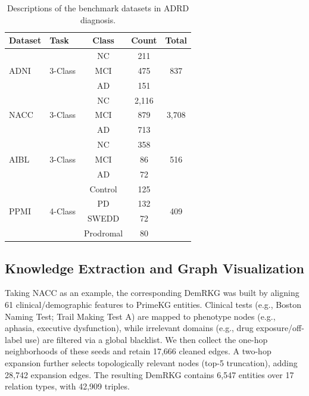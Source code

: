 \documentclass[lettersize,journal]{IEEEtran}
\begin{document}
    \begin{table}[htbp]
        \centering
        \caption{Descriptions of the benchmark datasets in ADRD diagnosis.}
        \label{tab:dataset_statistics}
        \begin{tabular}{llccc}
            \toprule
            \textbf{Dataset} & \textbf{Task} & \textbf{Class} & \textbf{Count} & \textbf{Total} \\
            \midrule
            \multirow{3}{*}{ADNI} & \multirow{3}{*}{3-Class} & NC & 211 & \multirow{3}{*}{837} \\
            & & MCI & 475 & \\
            & & AD & 151 & \\
            \midrule
            \multirow{3}{*}{NACC} & \multirow{3}{*}{3-Class} & NC & 2,116 & \multirow{3}{*}{3,708} \\
            & & MCI & 879 & \\
            & & AD & 713 & \\
            \midrule
            \multirow{3}{*}{AIBL} & \multirow{3}{*}{3-Class} & NC & 358 & \multirow{3}{*}{516} \\
            & & MCI & 86 & \\
            & & AD & 72 & \\
            \midrule
            \multirow{4}{*}{PPMI} & \multirow{4}{*}{4-Class} & Control & 125 & \multirow{4}{*}{409} \\
            & & PD & 132 & \\
            & & SWEDD & 72 & \\
            & & Prodromal & 80 & \\
            \bottomrule
        \end{tabular}
    \end{table}

\subsection{Knowledge Extraction and Graph Visualization}


    Taking NACC as an example, the corresponding DemRKG was built by aligning 61 clinical/demographic features to PrimeKG entities. Clinical tests (e.g., Boston Naming Test; Trail Making Test A) are mapped to phenotype nodes (e.g., aphasia, executive dysfunction), while irrelevant domains (e.g., drug exposure/off-label use) are filtered via a global blacklist. We then collect the one-hop neighborhoods of these seeds and retain 17,666 cleaned edges. A two-hop expansion further selects topologically relevant nodes (top-5 truncation), adding 28,742 expansion edges. The resulting DemRKG contains 6,547 entities over 17 relation types, with 42,909 triples.
\end{document}
